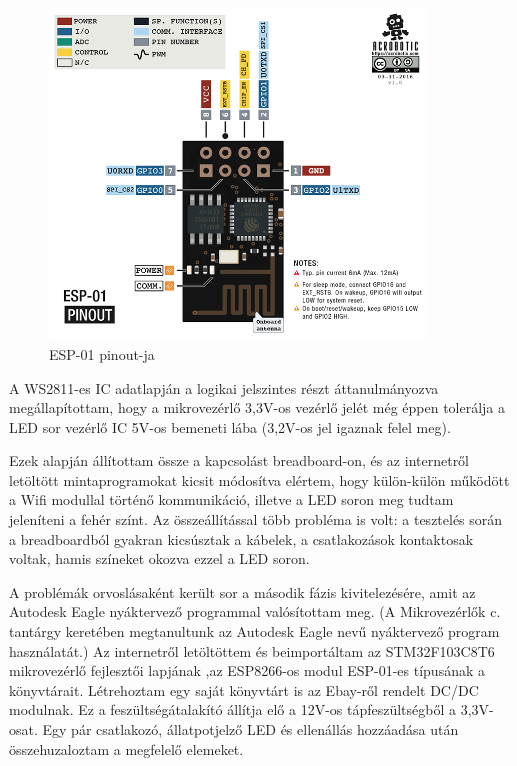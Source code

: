 \documentclass[../main.tex]{subfiles}
\begin{document}
        \begin{figure}[h!]
            \centering
                \includegraphics[width=10cm]{resources/pcb_res/esp8266_esp01_pinout.png}
            \caption{ESP-01 pinout-ja}
            \label{fig:eps01_pinout}
        \end{figure}
        
        A WS2811-es IC adatlapján a logikai jelszintes részt áttanulmányozva megállapítottam, hogy a mikrovezérlő 3,3V-os vezérlő jelét még éppen tolerálja a LED sor vezérlő IC 5V-os bemeneti lába (3,2V-os jel igaznak felel meg). 
        
        Ezek alapján állítottam össze a kapcsolást breadboard-on, és az internetről letöltött mintaprogramokat kicsit módosítva elértem, hogy külön-külön működött a Wifi modullal történő kommunikáció, illetve a LED soron meg tudtam jeleníteni a fehér színt. Az összeállítással több probléma is volt: a tesztelés során a breadboardból gyakran kicsúsztak a kábelek, a csatlakozások kontaktosak voltak, hamis színeket okozva ezzel a LED soron. 
        
        A problémák orvoslásaként került sor a második fázis kivitelezésére, amit az Autodesk Eagle nyáktervező programmal valósítottam meg. (A Mikrovezérlők c. tantárgy keretében megtanultunk az Autodesk Eagle nevű nyáktervező program használatát.) Az internetről letöltöttem és beimportáltam az STM32F103C8T6 mikrovezérlő fejlesztői lapjának
        ,az ESP8266-os modul ESP-01-es 
        típusának a könyvtárait. Létrehoztam egy saját könyvtárt is az Ebay-ről rendelt DC/DC modulnak. Ez a feszültségátalakító állítja elő a 12V-os tápfeszültségből a 3,3V-osat. Egy pár csatlakozó, állatpotjelző LED és ellenállás hozzáadása után összehuzaloztam a megfelelő elemeket. 
        
\end{document}
